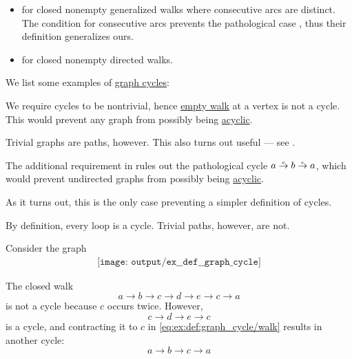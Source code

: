 \begin{remark}
\begin{thmenum}
\begin{itemize}
      \item {} for closed nonempty generalized walks where consecutive arcs are distinct. The condition for consecutive arcs prevents the pathological case , thus their definition generalizes ours.

      \item {} for closed nonempty directed walks.
    \end{itemize}
  \end{thmenum}
\end{remark}

\begin{example}\label{ex:def:graph_cycle}
  We list some examples of \hyperref[def:graph_cycle]{graph cycles}:
  \begin{thmenum}
     We require cycles to be nontrivial, hence \hyperref[def:graph_walk/empty]{empty walk} at a vertex is not a cycle. This would prevent any graph from possibly being \hyperref[def:acyclic_graph]{acyclic}.

    Trivial graphs are paths, however. This also turns out useful --- see .

     The additional requirement in  rules out the pathological cycle \( a \reloset e \to b \reloset e \to a \), which would prevent undirected graphs from possibly being \hyperref[def:acyclic_graph]{acyclic}.

    As it turns out, this is the only case preventing a simpler definition of cycles.

     By definition, every loop is a cycle. Trivial paths, however, are not.

     Consider the graph
    \begin{equation}\label{eq:ex:def:graph_cycle/eight}
      \begin{aligned}
        \texttt{[image: output/ex\_\_def\_\_graph\_cycle]}
      \end{aligned}
    \end{equation}

    The closed walk
    \begin{equation}\label{eq:ex:def:graph_cycle/walk}
      a \to b \to c \to d \to e \to c \to a
    \end{equation}
    is not a cycle because \( c \) occurs twice. However,
    \begin{equation*}
      c \to d \to e \to c
    \end{equation*}
    is a cycle, and contracting it to \( c \) in \eqref{eq:ex:def:graph_cycle/walk} results in another cycle:
    \begin{equation*}
      a \to b \to c \to a
    \end{equation*}
  \end{thmenum}
\end{example}

